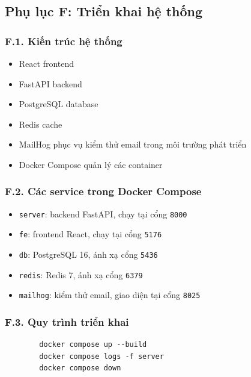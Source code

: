 \documentclass[13pt,a4paper]{extarticle}
\numberwithin{figure}{section}
\numberwithin{table}{section}
\begin{document}
	\subsection*{Phụ lục F: Triển khai hệ thống}
	
	\subsubsection*{F.1. Kiến trúc hệ thống}
	
	\noindent
	\begin{itemize}
		\item React frontend
		\item FastAPI backend
		\item PostgreSQL database
		\item Redis cache
		\item MailHog phục vụ kiểm thử email trong môi trường phát triển
		\item Docker Compose quản lý các container
	\end{itemize}
	
	\subsubsection*{F.2. Các service trong Docker Compose}
	
	\noindent
	\begin{itemize}
		\item \texttt{server}: backend FastAPI, chạy tại cổng \texttt{8000}
		\item \texttt{fe}: frontend React, chạy tại cổng \texttt{5176}
		\item \texttt{db}: PostgreSQL 16, ánh xạ cổng \texttt{5436}
		\item \texttt{redis}: Redis 7, ánh xạ cổng \texttt{6379}
		\item \texttt{mailhog}: kiểm thử email, giao diện tại cổng \texttt{8025}
	\end{itemize}
	
	\subsubsection*{F.3. Quy trình triển khai}
	
	\noindent
	\begin{lstlisting}
		docker compose up --build
		docker compose logs -f server
		docker compose down
	\end{lstlisting}
	
\end{document}
